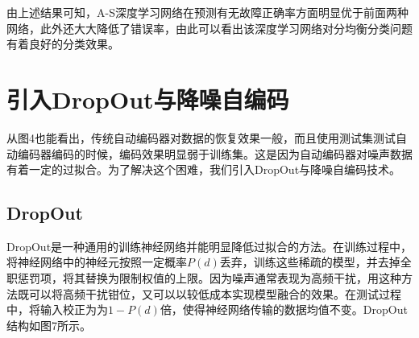 \documentclass{ctacn}%
\begin{document}
\begin{multicols}{2}
由上述结果可知，A-S深度学习网络在预测有无故障正确率方面明显优于前面两种网络，此外还大大降低了错误率，由此可以看出该深度学习网络对分均衡分类问题有着良好的分类效果。

\section{引入DropOut与降噪自编码}
从图4也能看出，传统自动编码器对数据的恢复效果一般，而且使用测试集测试自动编码器编码的时候，编码效果明显弱于训练集。这是因为自动编码器对噪声数据有着一定的过拟合。为了解决这个困难，我们引入DropOut与降噪自编码技术。

\subsection{DropOut}
DropOut是一种通用的训练神经网络并能明显降低过拟合的方法。在训练过程中，将神经网络中的神经元按照一定概率$P(d)$丢弃，训练这些稀疏的模型，并去掉全职惩罚项，将其替换为限制权值的上限。因为噪声通常表现为高频干扰，用这种方法既可以将高频干扰钳位，又可以以较低成本实现模型融合的效果。在测试过程中，将输入校正为为$1-P(d)$倍，使得神经网络传输的数据均值不变。DropOut结构如图7所示。


\end{multicols}
\end{document}
